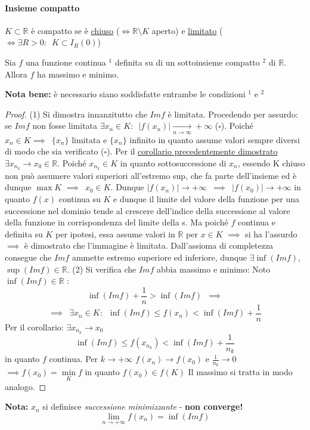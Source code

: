 \documentclass[10pt]{article}
\theoremstyle{plain}
\begin{document}
\paragraph{Insieme compatto}
\begin{defin}
$K \subset \mathbb{R}$ è compatto se è \underline{chiuso} ($\Leftrightarrow \mathbb{R} \setminus K$ aperto) e \underline{limitato} ($\Leftrightarrow \exists R > 0 : \enspace K \subset I_R(0)$)
\end{defin}
\hypertarget{weierstrass}{\begin{ther}
Sia $f$ una funzione continua $^1$ definita su di un sottoinsieme compatto $^2$ di $\mathbb{R}$. 
Allora $f$ ha massimo e minimo.
\end{ther}}
\textbf{Nota bene: } è necessario siano soddisfatte entrambe le condizioni $^1$ e $^2$
\begin{proof}
    (1) Si dimostra innanzitutto che $Im f$ è limitata. Procedendo per assurdo: se $Im f$ non fosse limitata $\exists x_n \in K : \enspace |f(x_n)| \xrightarrow[n \rightarrow \infty]{} + \infty$ ($\square$).
    Poiché $x_n \in K \implies \enspace \{x_n\}$ limitata e $\{x_n\}$ infinito in quanto assume valori sempre diversi di modo che sia verificato ($\square$). Per il \hyperlink{corollaier}{corollario precedentemente dimostrato} $\exists x_{n_k} \rightarrow x_0 \in \mathbb{R}$. \newline Poiché $x_{n_k} \in K$ in quanto sottosuccessione di $x_n$, essendo K chiuso non può assumere valori superiori all'estremo sup, che fa parte dell'insieme ed è dunque $\max K$ $\implies \enspace x_0 \in K$. 
    \newline Dunque $|f(x_n)| \longrightarrow + \infty \enspace \implies \enspace |f(x_0)| \longrightarrow + \infty$ in quanto $f(x)$ continua su $K$ e dunque il limite del valore della funzione per una successione nel dominio tende al crescere dell'indice della successione al valore della funzione in corrispondenza del limite della s. Ma poiché $f$ continua e definita su $K$ per ipotesi, essa assume valori in $\mathbb{R}$ per $x \in K$ $\implies$ si ha l'assurdo $\implies$ è dimostrato che l'immagine è limitata. \newline 
    Dall'assioma di completezza consegue che $Im f$ ammette estremo superiore ed inferiore, dunque $\exists \inf(Im f)$, $\sup(Im f) \in \mathbb{R}$. \newline
    (2) Si verifica che $Im f$ abbia massimo e minimo: \newline
    Noto $\inf(Im f) \in \mathbb{R}$ :
    \[\inf(Im f) + \frac{1}{n} > \inf(Im f) \enspace \implies\]
    \[\implies \enspace \exists x_n \in K : \enspace \inf(Im f) \leq f(x_n) < \inf(Im f) + \frac{1}{n}\]
    Per il corollario: $\exists x_{n_k} \rightarrow x_0$
    \[\inf(Im f) \leq f(x_{n_k}) < \inf(Im f) + \frac{1}{n_k}\]
    in quanto $f$ continua. Per $k \rightarrow + \infty$ $f(x_n) \rightarrow f(x_0)$ e $\frac{1}{n_k} \rightarrow 0$ $\implies f(x_0) = \min \limits_K f$ in quanto $f(x_0) \in f(K)$ \newline Il massimo si tratta in modo analogo.
\end{proof}
\textbf{Nota: } $x_n$ si definisce \textit{successione minimizzante} - \textbf{non converge!}
\[\lim \limits_{n \rightarrow + \infty} f(x_n)= \inf(Im f)\]
\end{document}
